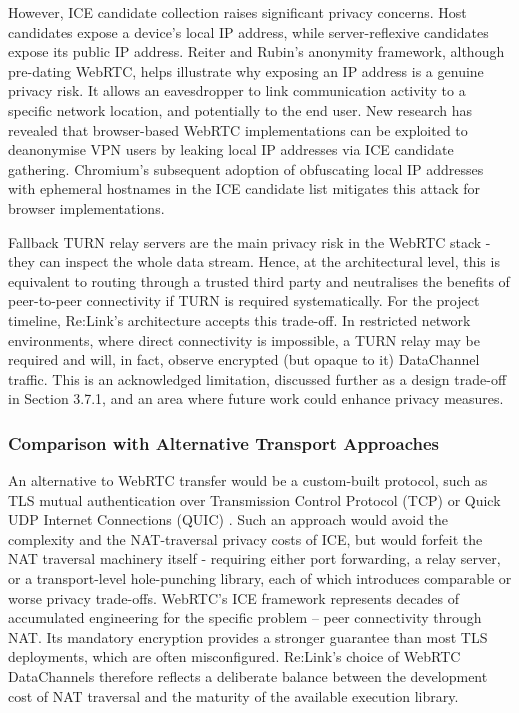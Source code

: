 \documentclass[12pt,a4paper]{article}
\begin{document}
However, ICE candidate collection raises significant privacy concerns. Host candidates expose a device’s local IP address, while server-reflexive candidates expose its public IP address. Reiter and Rubin’s \cite{reiter1998} anonymity framework, although pre-dating WebRTC, helps illustrate why exposing an IP address is a genuine privacy risk. It allows an eavesdropper to link communication activity to a specific network location, and potentially to the end user. New research has revealed that browser-based WebRTC implementations can be exploited to deanonymise VPN users by leaking local IP addresses via ICE candidate gathering. Chromium’s \cite{chromium} subsequent adoption of obfuscating local IP addresses with ephemeral hostnames in the ICE candidate list mitigates this attack for browser implementations.

Fallback TURN relay servers are the main privacy risk in the WebRTC stack - they can inspect the whole data stream. Hence, at the architectural level, this is equivalent to routing through a trusted third party and neutralises the benefits of peer-to-peer connectivity if TURN is required systematically. For the project timeline, Re:Link’s architecture accepts this trade-off. In restricted network environments, where direct connectivity is impossible, a TURN relay may be required and will, in fact, observe encrypted (but opaque to it) DataChannel traffic. This is an acknowledged limitation, discussed further as a design trade-off in Section 3.7.1, and an area where future work could enhance privacy measures.

\subsubsection{Comparison with Alternative Transport Approaches}

An alternative to WebRTC transfer would be a custom-built protocol, such as TLS mutual authentication over Transmission Control Protocol (TCP) or Quick UDP Internet Connections (QUIC) \cite{rfc9000}. Such an approach would avoid the complexity and the NAT-traversal privacy costs of ICE, but would forfeit the NAT traversal machinery itself - requiring either port forwarding, a relay server, or a transport-level hole-punching library, each of which introduces comparable or worse privacy trade-offs. WebRTC’s ICE framework represents decades of accumulated engineering for the specific problem – peer connectivity through NAT. Its mandatory encryption provides a stronger guarantee than most TLS deployments, which are often misconfigured. Re:Link’s choice of WebRTC DataChannels therefore reflects a deliberate balance between the development cost of NAT traversal and the maturity of the available execution library.
\end{document}

